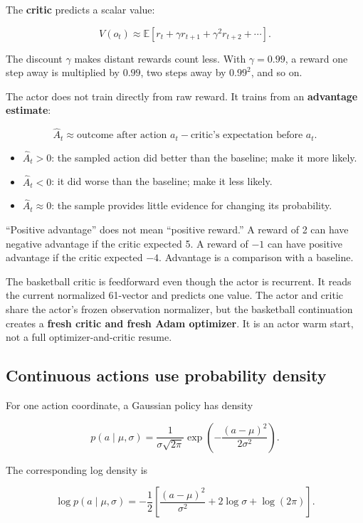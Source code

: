 \documentclass[
  american,
  11pt,
  letterpaper,
]{article}
\providecommand{\tightlist}{%
  \setlength{\itemsep}{0pt}\setlength{\parskip}{0pt}}
\begin{document}
The \textbf{critic} predicts a scalar value:

\[
V(o_t)\approx
\mathbb E[r_t+\gamma r_{t+1}+\gamma^2r_{t+2}+\cdots].
\]

The discount \(\gamma\) makes distant rewards count less. With
\(\gamma=0.99\), a reward one step away is multiplied by \(0.99\), two
steps away by \(0.99^2\), and so on.

The actor does not train directly from raw reward. It trains from an
\textbf{advantage estimate}:

\[
\widehat A_t \approx
\text{outcome after action }a_t
-
\text{critic's expectation before }a_t.
\]

\begin{itemize}
\tightlist
\item
  \(\widehat A_t>0\): the sampled action did better than the baseline;
  make it more likely.
\item
  \(\widehat A_t<0\): it did worse than the baseline; make it less
  likely.
\item
  \(\widehat A_t\approx0\): the sample provides little evidence for
  changing its probability.
\end{itemize}

``Positive advantage'' does not mean ``positive reward.'' A reward of 2
can have negative advantage if the critic expected 5. A reward of \(-1\)
can have positive advantage if the critic expected \(-4\). Advantage is
a comparison with a baseline.

The basketball critic is feedforward even though the actor is recurrent.
It reads the current normalized 61-vector and predicts one value. The
actor and critic share the actor's frozen observation normalizer, but
the basketball continuation creates a \textbf{fresh critic and fresh
Adam optimizer}. It is an actor warm start, not a full
optimizer-and-critic resume.

\subsection{Continuous actions use probability
density}\label{continuous-actions-use-probability-density}

For one action coordinate, a Gaussian policy has density

\[
p(a\mid\mu,\sigma)
=
\frac{1}{\sigma\sqrt{2\pi}}
\exp\left(
-\frac{(a-\mu)^2}{2\sigma^2}
\right).
\]

The corresponding log density is

\[
\log p(a\mid\mu,\sigma)
=
-\frac12\left[
\frac{(a-\mu)^2}{\sigma^2}
+2\log\sigma
+\log(2\pi)
\right].
\]
\end{document}
